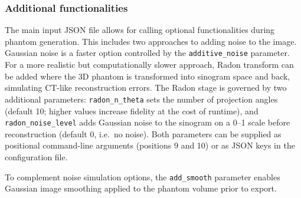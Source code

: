 \documentclass[preprint,12pt, a4paper]{elsarticle}
\begin{document}
\subsubsection{Additional functionalities}
The main input JSON file allows for calling optional functionalities during phantom generation. This includes two approaches to adding noise to the image. Gaussian noise is a faster option controlled by the \verb|additive_noise| parameter. For a more realistic but computationally slower approach, Radon transform can be added where the 3D phantom is transformed into sinogram space and back, simulating CT-like reconstruction errors. The Radon stage is governed by two additional parameters: \verb|radon_n_theta| sets the number of projection angles (default 10; higher values increase fidelity at the cost of runtime), and \verb|radon_noise_level| adds Gaussian noise to the sinogram on a 0--1 scale before reconstruction (default 0, i.e.\ no noise). Both parameters can be supplied as positional command-line arguments (positions 9 and 10) or as JSON keys in the configuration file.

To complement noise simulation options, the \verb|add_smooth| parameter enables Gaussian image smoothing applied to the phantom volume prior to export.
\end{document}
